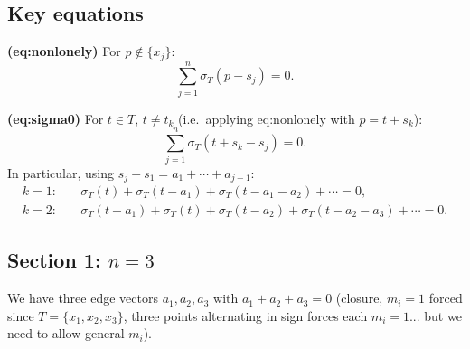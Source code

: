 %
%
%

\subsection*{Key equations}

\textbf{(eq:nonlonely)} For $p \notin \{x_j\}$:
\[
  \sum_{j=1}^{n} \sigma_T(p - s_j) = 0.
\]

\textbf{(eq:sigma0)} For $t \in T$, $t \neq t_k$ (i.e.\ applying eq:nonlonely with $p = t + s_k$):
\[
  \sum_{j=1}^{n} \sigma_T(t + s_k - s_j) = 0.
\]
In particular, using $s_j - s_1 = a_1 + \cdots + a_{j-1}$:
\begin{align*}
  k=1:&\quad \sigma_T(t) + \sigma_T(t - a_1) + \sigma_T(t - a_1 - a_2) + \cdots = 0,\\
  k=2:&\quad \sigma_T(t + a_1) + \sigma_T(t) + \sigma_T(t - a_2) + \sigma_T(t - a_2 - a_3) + \cdots = 0.
\end{align*}

\subsection*{Section 1: $n = 3$}

We have three edge vectors $a_1, a_2, a_3$ with $a_1 + a_2 + a_3 = 0$ (closure, $m_i = 1$ forced since $T = \{x_1, x_2, x_3\}$, three points alternating in sign forces each $m_i = 1$... but we need to allow general $m_i$).

